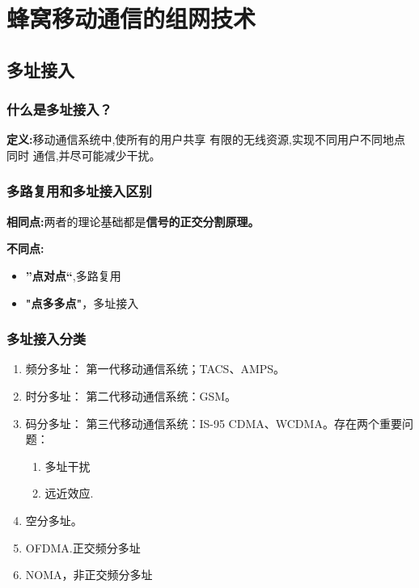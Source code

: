 \documentclass[a4paper ]{report}
\begin{document}
	\section{蜂窝移动通信的组网技术}
	\subsection{多址接入}
	\subsubsection{什么是多址接入？}
	\textbf{定义:}移动通信系统中,使所有的用户共享
	有限的无线资源,实现不同用户不同地点同时
	通信,并尽可能减少干扰。
	\subsubsection{多路复用和多址接入区别}
	\textbf{相同点:}两者的理论基础都是\textbf{信号的正交分割原理。}
	
	\textbf{不同点:}
	\begin{itemize}
		\item \textbf{”点对点“},多路复用
		\item \textbf{"点多多点"}，多址接入
	\end{itemize}
	
	\subsubsection{多址接入分类}
	\begin{enumerate}
		\item 频分多址： 第一代移动通信系统；TACS、AMPS。
		\item 时分多址： 第二代移动通信系统：GSM。
		\item 码分多址： 第三代移动通信系统：IS-95 CDMA、WCDMA。存在两个重要问题：
		\begin{enumerate}
			\item  多址干扰
			\item  远近效应.
		\end{enumerate}
		\item 空分多址。
		\item OFDMA.正交频分多址
		\item NOMA，非正交频分多址
	\end{enumerate}
\end{document}
